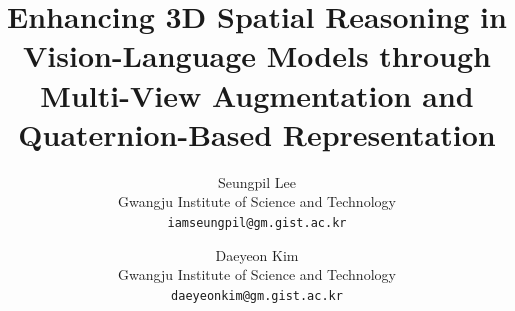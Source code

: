 \documentclass[10pt,twocolumn,letterpaper]{article}
\title{Enhancing 3D Spatial Reasoning in Vision-Language Models through Multi-View Augmentation and Quaternion-Based Representation}
\author{Seungpil Lee\\
Gwangju Institute of Science and Technology \\
{\tt\small iamseungpil@gm.gist.ac.kr}
\and
Daeyeon Kim\\
Gwangju Institute of Science and Technology\\
{\tt\small daeyeonkim@gm.gist.ac.kr}
}
\begin{document}
\maketitle



% 



{
    \small
    
    
}

% 
\end{document}
